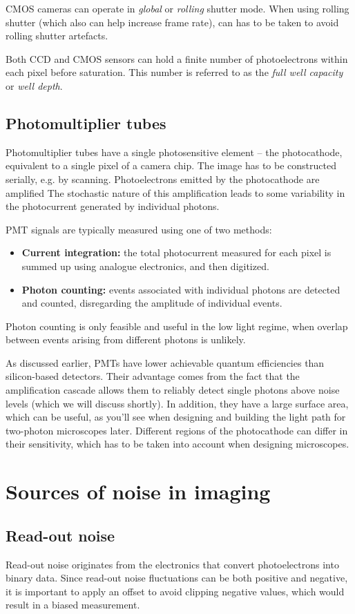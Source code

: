 \documentclass[a4paper]{report}
\begin{document}
CMOS cameras can operate in \textit{global} or \textit{rolling} shutter mode. 
When using rolling shutter (which also can help increase frame rate), can has to be taken to avoid rolling shutter artefacts.

Both CCD and CMOS sensors can hold a finite number of photoelectrons within each pixel before saturation. This number is referred to as the \textit{full well capacity} or \textit{well depth}.
\subsection{Photomultiplier tubes}
Photomultiplier tubes have a single photosensitive element -- the photocathode, equivalent to a single pixel of a camera chip. 
The image has to be constructed serially, e.g. by scanning. 
Photoelectrons emitted by the photocathode are amplified 
The stochastic nature of this amplification leads to some variability in the photocurrent generated by individual photons. 

PMT signals are typically measured using one of two methods:
\begin{itemize}
	\item \textbf{Current integration:} the total photocurrent measured for each pixel is summed up using analogue electronics, and then digitized.
	\item \textbf{Photon counting:} events associated with individual photons are detected and counted, disregarding the amplitude of individual events.
\end{itemize} 
Photon counting is only feasible and useful in the low light regime, when overlap between events arising from different photons is unlikely.

As discussed earlier, PMTs have lower achievable quantum efficiencies than silicon-based detectors. 
Their advantage comes from the fact that the amplification cascade allows them to reliably detect single photons above noise levels (which we will discuss shortly). 
In addition, they have a large surface area, which can be useful, as you'll see when designing and building the light path for two-photon microscopes later. 
Different regions of the photocathode can differ in their sensitivity, which has to be taken into account when designing microscopes.

\section{Sources of noise in imaging}
\subsection{Read-out noise}
Read-out noise originates from the electronics that convert photoelectrons into binary data. 
Since read-out noise fluctuations can be both positive and negative, it is important to apply an offset to avoid clipping negative values, which would result in a biased measurement.
\end{document}
